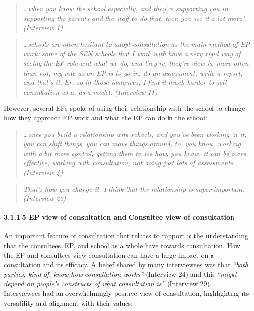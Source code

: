 \documentclass[
  english,
  man]{apa7}
\let\oldparagraph\paragraph
\renewcommand{\paragraph}[1]{\oldparagraph{#1}\mbox{}}
\begin{document}
\begin{quote}
\emph{\ldots when you know the school especially, and they're supporting you in
supporting the parents and the staff to do that, then you see it a lot
more". (Interview 1)}
\end{quote}

\begin{quote}
\emph{\ldots schools are often hesitant to adopt consultation as the main method
of EP work: some of the SEN schools that I work with have a very rigid
way of seeing the EP role and what we do, and they're, they're view
is, more often than not, my role as an EP is to go in, do an
assessment, write a report, and that's it. Er, so in those instances,
I find it much harder to sell consultation as a, as a model.
(Interview 11)}
\end{quote}

However, several EPs spoke of using their relationship with the school to change how they approach EP work and what the EP can do in the school:

\begin{quote}
\emph{\ldots once you build a relationship with schools, and you've been working
in it, you can shift things, you can move things around, to, you know,
working with a bit more control, getting them to see how, you know, it
can be more effective, working with consultation, not doing just lots
of assessments. (Interview 4)}
\end{quote}

\begin{quote}
\emph{That's how you change it. I think that the relationship is super
important. (Interview 23)}
\end{quote}

\hypertarget{ep-view-of-consultation-and-consultee-view-of-consultation}{%
\paragraph{3.1.1.5 EP view of consultation and Consultee view of consultation}\label{ep-view-of-consultation-and-consultee-view-of-consultation}}

An important feature of consultation that relates to rapport is the understanding that the consultees, EP, and school as a whole have towards consultation. How the EP and consultees view consultation can have a large impact on a consultation and its efficacy. A belief shared by many interviewees was that \emph{``both parties, kind of, know how consultation works''} (Interview 24) and this \emph{``might depend on people's constructs of what consultation is''} (Interview 29). Interviewees had an overwhelmingly positive view of consultation, highlighting its versatility and alignment with their values:
\end{document}
